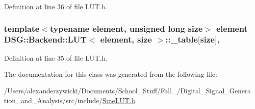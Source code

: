 Definition at line 36 of file L\+U\+T.\+h.

\hypertarget{classDSG_1_1Backend_1_1LUT_a23615428e84d6be4424c8b897866f253}{
\subsubsection[{\+\_\+table}]{\setlength{\rightskip}{0pt plus 5cm}template$<$typename element, unsigned long size$>$ element {\bf D\+S\+G\+::\+Backend\+::\+L\+U\+T}$<$ element, size $>$\+::\+\_\+table\mbox{[}size\mbox{]}\hspace{0.3cm}{\ttfamily [protected]}, {\ttfamily [inherited]}}}\label{classDSG_1_1Backend_1_1LUT_a23615428e84d6be4424c8b897866f253}


Definition at line 35 of file L\+U\+T.\+h.



The documentation for this class was generated from the following file\+:\begin{DoxyCompactItemize}
\item 
/\+Users/alexanderzywicki/\+Documents/\+School\+\_\+\+Stuff/\+Fall\+\_/\+Digital\+\_\+\+Signal\+\_\+\+Generation\+\_\+and\+\_\+\+Analysis/src/include/\hyperlink{SineLUT_8h}{Sine\+L\+U\+T.\+h}\end{DoxyCompactItemize}
